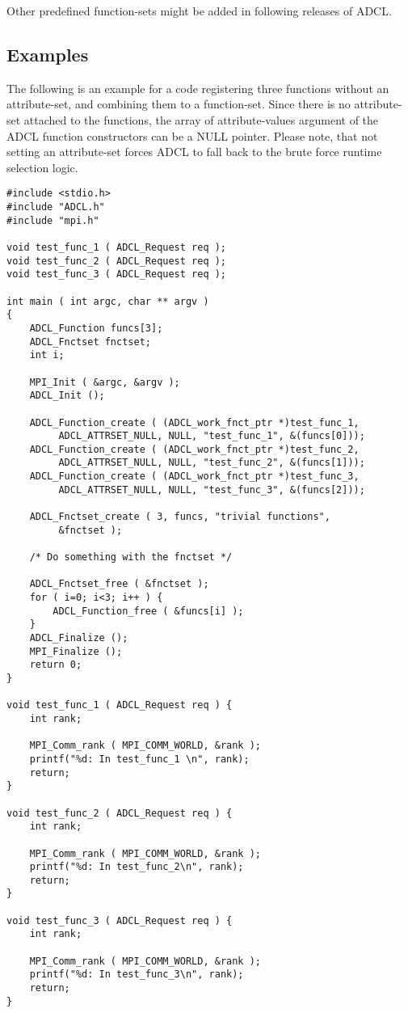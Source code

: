 Other predefined function-sets might be added in following releases of ADCL.

\subsection{Examples}

The following is an example for a code registering three functions without an attribute-set, and combining them to a function-set. Since there is no attribute-set attached to the functions, the array of attribute-values argument of the ADCL function constructors can be a NULL pointer. Please note, that not setting an attribute-set forces ADCL to fall back to the brute force runtime selection logic.
\begin{verbatim}
#include <stdio.h>
#include "ADCL.h"
#include "mpi.h"

void test_func_1 ( ADCL_Request req );
void test_func_2 ( ADCL_Request req );
void test_func_3 ( ADCL_Request req );

int main ( int argc, char ** argv ) 
{
    ADCL_Function funcs[3];
    ADCL_Fnctset fnctset;
    int i;
        
    MPI_Init ( &argc, &argv );
    ADCL_Init ();

    ADCL_Function_create ( (ADCL_work_fnct_ptr *)test_func_1, 
         ADCL_ATTRSET_NULL, NULL, "test_func_1", &(funcs[0]));
    ADCL_Function_create ( (ADCL_work_fnct_ptr *)test_func_2, 
         ADCL_ATTRSET_NULL, NULL, "test_func_2", &(funcs[1]));
    ADCL_Function_create ( (ADCL_work_fnct_ptr *)test_func_3, 
         ADCL_ATTRSET_NULL, NULL, "test_func_3", &(funcs[2]));

    ADCL_Fnctset_create ( 3, funcs, "trivial functions", 
         &fnctset );

    /* Do something with the fnctset */
    
    ADCL_Fnctset_free ( &fnctset );
    for ( i=0; i<3; i++ ) {
      	ADCL_Function_free ( &funcs[i] );
    }    
    ADCL_Finalize ();
    MPI_Finalize ();
    return 0;
}

void test_func_1 ( ADCL_Request req ) {
    int rank;
    
    MPI_Comm_rank ( MPI_COMM_WORLD, &rank );
    printf("%d: In test_func_1 \n", rank);
    return;
}

void test_func_2 ( ADCL_Request req ) {
    int rank;
    
    MPI_Comm_rank ( MPI_COMM_WORLD, &rank );
    printf("%d: In test_func_2\n", rank);
    return;
}

void test_func_3 ( ADCL_Request req ) {
    int rank;
    
    MPI_Comm_rank ( MPI_COMM_WORLD, &rank ); 
    printf("%d: In test_func_3\n", rank);
    return;
}

\end{verbatim}